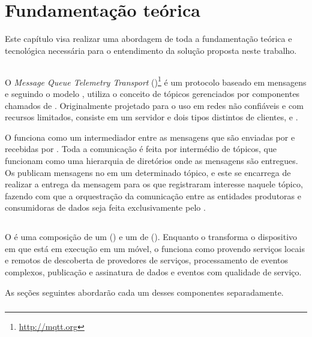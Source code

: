 \chapter{Fundamentação teórica} \label{chap:fundamentacao}

Este capítulo visa realizar uma abordagem de toda a fundamentação teórica e tecnológica necessária para o entendimento da solução proposta neste trabalho.

\section{\mqtt}

O \textit{Message Queue Telemetry Transport} (\mqtt)\footnote{\url{http://mqtt.org}} é um protocolo baseado em mensagens e seguindo o modelo \pubsub, utiliza o conceito de tópicos gerenciados por componentes chamados de \brokers. Originalmente projetado para o uso em redes não confiáveis e com recursos limitados, consiste em um servidor \broker e dois tipos distintos de clientes, \pubs e \subs \cite{lee:et:al:2013}.

O \broker funciona como um intermediador entre as mensagens que são enviadas por \pubs e recebidas por \subs. Toda a comunicação é feita por intermédio de tópicos, que funcionam como uma hierarquia de diretórios onde as mensagens são entregues. Os \pubs publicam mensagens no \broker em um determinado tópico, e este se encarrega de realizar a entrega da mensagem para os \subs que registraram interesse naquele tópico, fazendo com que a orquestração da comunicação entre as entidades produtoras e consumidoras de dados seja feita exclusivamente pelo \broker.

\section{\mhubcddl}

O \mhubcddl é uma composição de um \gateway (\mhub) e um \middleware de \iomt (\cddl). Enquanto o \mhub transforma o dispositivo \android em que está em execução em um \gateway \iot móvel, o \cddl funciona como \middleware provendo serviços locais e remotos de descoberta de provedores de serviços, processamento de eventos complexos, publicação e assinatura de dados e eventos com qualidade de serviço.

As seções seguintes abordarão cada um desses componentes separadamente.

\subsection{\mhub}

